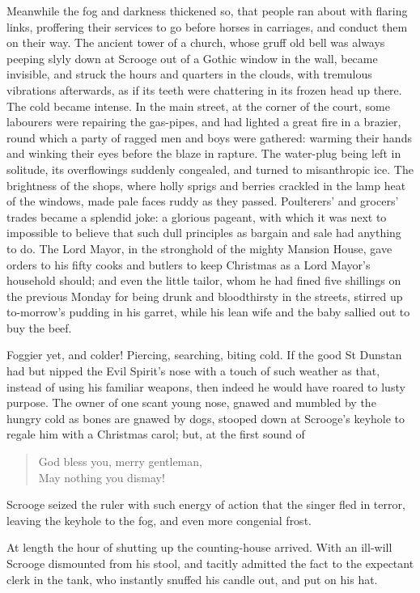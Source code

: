 \documentclass[paper=5.5in:8.5in,BCOR=7mm,twoside,DIV=calc,12pt,usegeometry]{scrbook} %
\begin{document}
Meanwhile the fog and darkness thickened so, that people ran about with flaring links, proffering their services to go before horses in carriages, and conduct them on their way. The ancient tower of a church, whose gruff old bell was always peeping slyly down at Scrooge out of a Gothic window in the wall, became invisible, and struck the hours and quarters in the clouds, with tremulous vibrations afterwards, as if its teeth were chattering in its frozen head up there. The cold became intense. In the main street, at the corner of the court, some labourers were repairing the gas-pipes, and had lighted a great fire in a brazier, round which a party of ragged men and boys were gathered: warming their hands and winking their eyes before the blaze in rapture. The water-plug being left in solitude, its overflowings suddenly congealed, and turned to misanthropic ice. The brightness of the shops, where holly sprigs and berries crackled in the lamp heat of the windows, made pale faces ruddy as they passed. Poulterers' and grocers' trades became a splendid joke: a glorious pageant, with which it was next to impossible to believe that such dull principles as bargain and sale had anything to do. The Lord Mayor, in the stronghold of the mighty Mansion House, gave orders to his fifty cooks and butlers to keep Christmas as a Lord Mayor's household should; and even the little tailor, whom he had fined five shillings on the previous Monday for being drunk and bloodthirsty in the streets, stirred up to-morrow's pudding in his garret, while his lean wife and the baby sallied out to buy the beef.

Foggier yet, and colder! Piercing, searching, biting cold. If the good St Dunstan had but nipped the Evil Spirit's nose with a touch of such weather as that, instead of using his familiar weapons, then indeed he would have roared to lusty purpose. The owner of one scant young nose, gnawed and mumbled by the hungry cold as bones are gnawed by dogs, stooped down at Scrooge's keyhole to regale him with a Christmas carol; but, at the first sound of 
\blockquote{God bless you, merry gentleman,\\
May nothing you dismay!}

Scrooge seized the ruler with such energy of action that the singer fled in terror, leaving the keyhole to the fog, and even more congenial frost.

At length the hour of shutting up the counting-house arrived. With an ill-will Scrooge dismounted from his stool, and tacitly admitted the fact to the expectant clerk in the tank, who instantly snuffed his candle out, and put on his hat.
\end{document}
